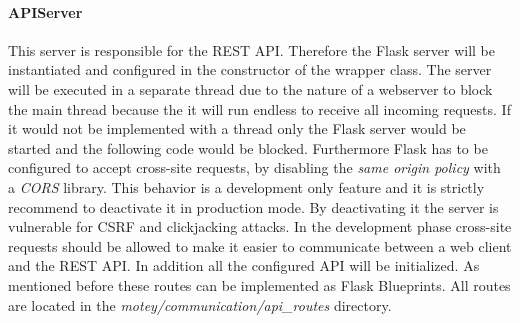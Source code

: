 \paragraph{APIServer} This server is responsible for the \ac{REST} \ac{API}.
Therefore the Flask server will be instantiated and configured in the constructor of the wrapper class.
The server will be executed in a separate thread due to the nature of a webserver to block the main thread because the it will run endless to receive all incoming requests.
If it would not be implemented with a thread only the Flask server would be started and the following code would be blocked.
Furthermore Flask has to be configured to accept cross-site requests, by disabling the \textit{same origin policy} with a \textit{\ac{CORS}} library.
This behavior is a development only feature and it is strictly recommend to deactivate it in production mode.
By deactivating it the server is vulnerable for \ac{CSRF} and clickjacking attacks.
In the development phase cross-site requests should be allowed to make it easier to communicate between a web client and the \ac{REST} \ac{API}.
In addition all the configured \ac{API} will be initialized.
As mentioned before these routes can be implemented as Flask Blueprints.
All routes are located in the \textit{motey/communication/api\_routes} directory.\newline

